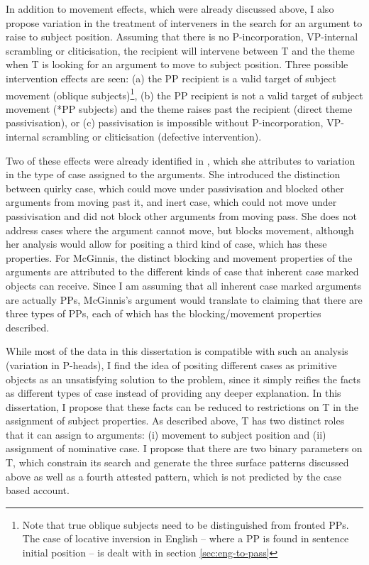 In addition to movement effects, which were already discussed above, I also propose variation in the treatment of interveners in the search for an argument to raise to subject position. Assuming that there is no P-incorporation, VP-internal scrambling or cliticisation, the recipient will intervene between T and the theme when T is looking for an argument to move to subject position. Three possible intervention effects are seen: (a) the PP recipient is a valid target of subject movement (oblique subjects)\footnote{Note that true oblique subjects need to be distinguished from fronted PPs. The case of locative inversion in English -- where a PP is found in sentence initial position -- is dealt with in section \ref{sec:eng-to-pass}}, (b) the PP recipient is not a valid target of subject movement (*PP subjects) and the theme raises past the recipient (direct theme passivisation), or (c) passivisation is impossible without P-incorporation, VP-internal scrambling or cliticisation (defective intervention). 

Two of these effects were already identified in \cite{McGinnis.1998b}, which she attributes to variation in the type of case assigned to the arguments. She introduced the distinction between quirky case, which could move under passivisation and blocked other arguments from moving past it, and inert case, which could not move under passivisation and did not block other arguments from moving pass. She does not address cases where the argument cannot move, but blocks movement, although her analysis would allow for positing a third kind of case, which has these properties. For McGinnis, the distinct blocking and movement properties of the arguments are attributed to the different kinds of case that inherent case marked objects can receive. Since I am assuming that all inherent case marked arguments are actually PPs, McGinnis's argument would translate to claiming that there are three types of PPs, each of which has the blocking/movement properties described.

While most of the data in this dissertation is compatible with such an analysis (variation in P-heads), I find the idea of positing different cases as primitive objects as an unsatisfying solution to the problem, since it simply reifies the facts as different types of case instead of providing any deeper explanation. In this dissertation, I propose that these facts can be reduced to restrictions on T in the assignment of subject properties. As described above, T has two distinct roles that it can assign to arguments: (i) movement to subject position and (ii) assignment of nominative case. I propose that there are two binary parameters on T, which constrain its search and generate the three surface patterns discussed above as well as a fourth attested pattern, which is not predicted by the case based account.

